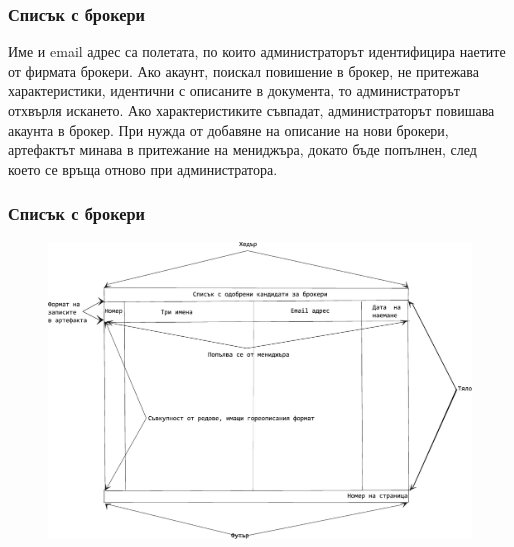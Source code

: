 \documentclass[12pt]{beamer}
\begin{document}
\begin{frame}[fragile]
\frametitle{Списък с брокери}
Име и email адрес са полетата, по които администраторът идентифицира наетите от фирмата брокери. Ако акаунт, поискал повишение в брокер, не притежава характеристики, идентични с описаните в документа, то администраторът отхвърля искането. Ако характеристиките съвпадат, администраторът повишава акаунта в брокер. При нужда от добавяне на описание на нови брокери, артефактът минава в притежание на мениджъра, докато бъде попълнен, след което се връща отново при администратора. 
\end{frame}

\begin{frame}[fragile]
\frametitle{Списък с брокери}
	\begin{figure}[h]
	\centering
	\includegraphics[scale=0.52]{art-textFile}
	\end{figure}
\end{frame}
\end{document}
